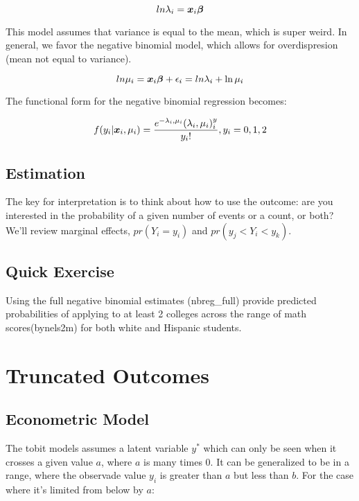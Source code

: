 \documentclass[12 pt]{article}
\begin{document}
\begin{equation}
  \label{eq:2}
  ln \lambda_i=\boldsymbol{x}_i\boldsymbol{\beta}
\end{equation}

This model assumes that variance is equal to the mean, which is super weird. In general, we favor the negative binomial model, which allows for overdispresion (mean not equal to variance). 

\begin{equation}
  \label{eq:3}
  ln \mu_i=\boldsymbol{x}_i\boldsymbol{\beta} +\epsilon_i= ln \lambda_i +\ln \mu_i
\end{equation}

The functional form for the negative binomial regression becomes:

\begin{equation}
  \label{eq:4}
  f(y_i|\boldsymbol{x}_i, \mu_i)=\frac{e^{-\lambda_i,\mu_i}(\lambda_i,\mu_i)^y_i}{y_i!}, y_i=0,1,2
\end{equation}


\subsection{Estimation}
The key for interpretation is to think about how to use the outcome: are you interested in the probability of a given number of events or a count, or both? We'll review marginal effects, $pr(Y_i=y_i)$ and $pr(y_j<Y_i<y_k)$.



\subsection{Quick Exercise}
\label{sec:quick-exercise}

Using the full negative binomial estimates (nbreg\_full) provide predicted probabilities of applying to at least 2 colleges across the range of math scores(bynels2m) for both white and Hispanic students. 


\section{Truncated Outcomes}

\subsection{Econometric Model}

The tobit models assumes a latent variable $y^*$ which can only be seen when it crosses a given value $a$, where $a$ is many times 0. It can be generalized to be in a range, where the observade value $y_i$ is greater than $a$ but less than $b$. For the case where it's limited from below by $a$:
\end{document}

